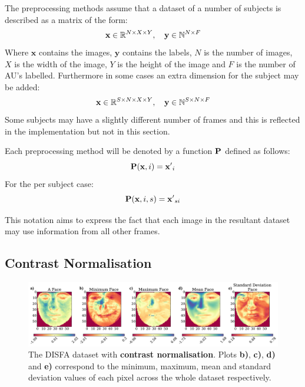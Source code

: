     The preprocessing methods assume that a dataset of a number of subjects
    is described as a matrix of the form:
    \begin{equation}
    {\bf x} \in \mathbb{R}^{N\times X \times Y},\quad {\bf y} \in \mathbb{N}^{N\times F}
    \end{equation}
    Where $\mathbf{x}$ contains the images, $\mathbf{y}$ contains the labels,
    $N$ is the number of images, $X$ is the width of the image, $Y$ is the height of the
    image and $F$ is the number of AU's labelled. Furthermore in some cases an extra dimension
    for the subject may be added:
    \begin{equation}
    {\bf x} \in \mathbb{R}^{S\times N\times X \times Y},\quad {\bf y} \in \mathbb{N}^{S\times N\times F}
    \end{equation}
    Some subjects may have a slightly different number of frames and this is reflected
    in the implementation but not in this section.

    Each preprocessing method will be denoted by a function ${\bf P}$ defined as follows:
    \begin{equation}
      {\bf P}({\bf x},i) = {\bf x'}_i
    \end{equation}
    For the per subject case:
    \begin{equation}
      {\bf P}({\bf x},i,s) = {\bf x'}_{si}
    \end{equation}

    This notation aims to express the fact that each image in the resultant dataset
    may use information from all other frames.

    \subsection{Contrast Normalisation}
      \begin{figure}[!h]
      \centering
      \includegraphics[width =\hsize]{figures/faces_contrast.pdf}
      \caption{The DISFA dataset with {\bf contrast normalisation}.
      Plots {\bf b)}, {\bf c)}, {\bf d)} and {\bf e)} correspond to the minimum,
      maximum, mean and standard deviation values of each pixel across the whole
      dataset respectively.}
      \label{fig:simple}
      \end{figure}

